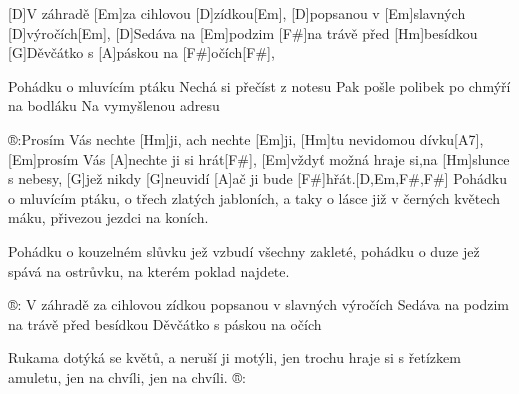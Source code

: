 
[D]V záhradě [Em]za cihlovou [D]zídkou[Em],
[D]popsanou v [Em]slavných [D]výročích[Em],
[D]Sedáva na [Em]podzim [F#]na trávě před [Hm]besídkou
[G]Děvčátko s [A]páskou na [F#]očích[F#],

Pohádku o mluvícím ptáku
Nechá si přečíst z notesu
Pak pošle polibek po chmýří na bodláku
Na vymyšlenou adresu

®:Prosím Vás nechte [Hm]ji, ach nechte [Em]ji,
[Hm]tu nevidomou dívku[A7],
[Em]prosím Vás [A]nechte ji si hrát[F#],
[Em]vždyť možná hraje si,na [Hm]slunce s nebesy,
[G]jež nikdy [G]neuvidí [A]ač ji bude [F#]hřát.[D,Em,F#,F#]
\slpc
Pohádku o mluvícím ptáku,
o třech zlatých jabloních,
a taky o lásce již v černých květech máku,
přivezou jezdci na koních.

Pohádku o kouzelném slůvku
jež vzbudí všechny zakleté,
pohádku o duze jež spává na ostrůvku,
na kterém poklad najdete.

®:
V záhradě za cihlovou zídkou
popsanou v slavných výročích
Sedáva na podzim na trávě před besídkou
Děvčátko s páskou na očích

Rukama dotýká se květů,
a neruší ji motýli,
jen trochu hraje si s řetízkem amuletu,
jen na chvíli, jen na chvíli. ®:
\vfill\null